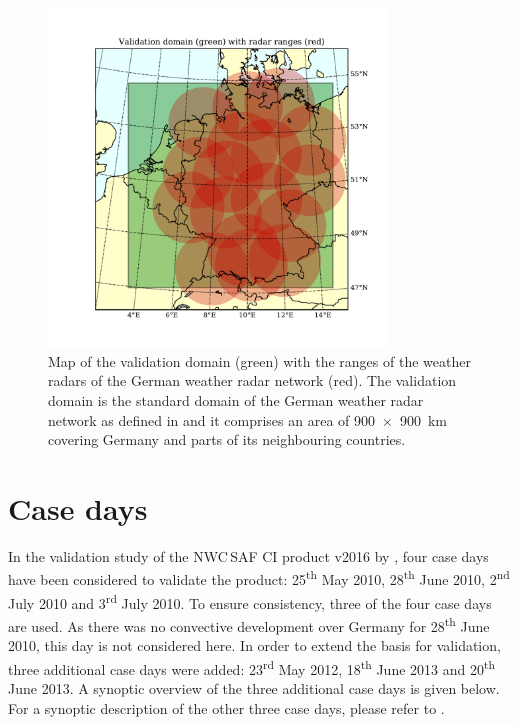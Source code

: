 \begin{figure}[htbp]
\centering
\includegraphics[width=0.8\textwidth]{Grafiken/Abbildungen/radolan_domain.pdf}
\caption{Map of the validation domain (green) with the ranges of the weather radars of the German weather radar network (red). The validation domain is the standard domain of the German weather radar network as defined in \citet{RADOLANkurz2018} and it comprises an area of \SI{900 x 900}{\kilo\metre} covering Germany and parts of its neighbouring countries.}
\label{fig:radolan_domain}
\end{figure}

\section{Case days}
In the validation study of the NWC\,SAF CI product v2016 by \citet{Karagiannidis2016}, four case days have been considered to validate the product: 25\textsuperscript{th} May 2010, 28\textsuperscript{th} June 2010, 2\textsuperscript{nd} July 2010 and 3\textsuperscript{rd} July 2010. To ensure consistency, three of the four case days are used. As there was no convective development over Germany for 28\textsuperscript{th} June 2010, this day is not considered here. In order to extend the basis for validation, three additional case days were added: 23\textsuperscript{rd} May 2012, 18\textsuperscript{th} June 2013 and 20\textsuperscript{th} June 2013. A synoptic overview of the three additional case days is given below. For a synoptic description of the other three case days, please refer to \citet{Karagiannidis2016}.

